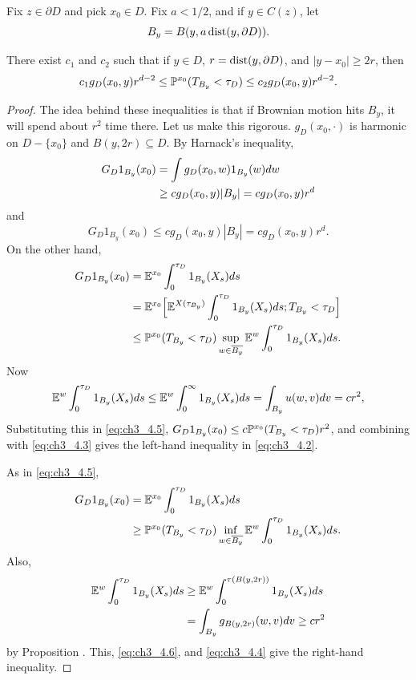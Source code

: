 Fix $z \in \partial D$ and pick $x_0 \in D$. Fix $a < 1/2$, and if $y \in C(z)$, let
\[
    B_y = B(y,a\dist(y,\partial D)).
\]

\begin{proposition}\label{prop:ch3_4.1}
There exist $c_1$ and $c_2$ such that if $y \in D$, $r = \dist(y,\partial D)$, and $|y-x_0| \geq 2r$, then
\begin{equation}\label{eq:ch3_4.2}
    c_1g_D(x_0,y)r^{d-2} \leq \P^{x_0}(T_{B_y} < \tau_D) \leq c_2g_D(x_0,y)r^{d-2}.
\end{equation}
\end{proposition}

\begin{proof}
The idea behind these inequalities is that if Brownian motion hits $B_y$, it will spend about $r^2$ time there. Let us make this rigorous. $g_D(x_0,\cdot)$ is harmonic on $D - \{x_0\}$ and $B(y,2r) \subseteq D$. By Harnack's inequality,
\begin{align}\label{eq:ch3_4.3}
    G_D1_{B_y}(x_0) &= \int g_D(x_0,w)1_{B_y}(w)dw \\
    &\geq cg_D(x_0,y)|B_y| = cg_D(x_0,y)r^d \notag
\end{align}
and
\begin{equation}\label{eq:ch3_4.4}
    G_D1_{B_y}(x_0) \leq cg_D(x_0,y)|B_y| = cg_D(x_0,y)r^d.
\end{equation}
On the other hand,
\begin{align}\label{eq:ch3_4.5}
    G_D1_{B_y}(x_0) &= \E^{x_0} \int_0^{\tau_D} 1_{B_y}(X_s)ds \\
    &= \E^{x_0}\Big[\E^{X(\tau_{B_y})} \int_0^{\tau_D} 1_{B_y}(X_s)ds; T_{B_y} < \tau_D\Big] \notag \\
    &\leq \P^{x_0}(T_{B_y} < \tau_D) \sup_{w\in\overline{B_y}} \E^w \int_0^{\tau_D} 1_{B_y}(X_s)ds. \notag
\end{align}
Now
\[
    \E^w \int_0^{\tau_D} 1_{B_y}(X_s)ds \leq \E^w \int_0^{\infty} 1_{B_y}(X_s)ds = \int_{B_y} u(w,v)dv = cr^2,
\]
Substituting this in \eqref{eq:ch3_4.5}, $G_D1_{B_y}(x_0) \leq c\P^{x_0}(T_{B_y} < \tau_D)r^2$, and combining with \eqref{eq:ch3_4.3} gives the left-hand inequality in \eqref{eq:ch3_4.2}.

As in \eqref{eq:ch3_4.5},
\begin{align}\label{eq:ch3_4.6}
    G_D1_{B_y}(x_0) &= \E^{x_0} \int_0^{\tau_D} 1_{B_y}(X_s)ds \\
    &\geq \P^{x_0}(T_{B_y} < \tau_D) \inf_{w\in\overline{B_y}} \E^w \int_0^{\tau_D} 1_{B_y}(X_s)ds. \notag
\end{align}
Also,
\begin{align*}
    \E^w \int_0^{\tau_D} 1_{B_y}(X_s)ds &\geq \E^w \int_0^{\tau(B(y,2r))} 1_{B_y}(X_s)ds \\
    &= \int_{B_y} g_{B(y,2r)}(w,v)dv \geq cr^2
\end{align*}
by Proposition . This, \eqref{eq:ch3_4.6}, and \eqref{eq:ch3_4.4} give the right-hand inequality.
\end{proof}

